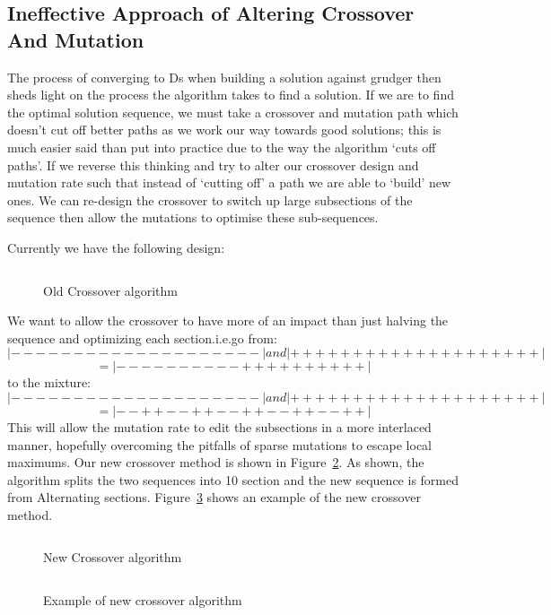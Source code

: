 \subsection{Ineffective Approach of Altering Crossover And Mutation}\label{subsec:ineffectiveApproachOfAlteringCrossoverAndMutation}
The process of converging to Ds when building a solution against grudger then sheds light on the process the algorithm takes to find a solution.
If we are to find the optimal solution sequence, we must take a crossover and mutation path which doesn't cut off better paths as we work our way towards good solutions;
this is much easier said than put into practice due to the way the algorithm `cuts off paths'.
If we reverse this thinking and try to alter our crossover design and mutation rate such that instead of `cutting off' a path we are able to `build' new ones.
We can re-design the crossover to switch up large subsections of the sequence then allow the mutations to optimise these sub-sequences.

Currently we have the following design:
\begin{figure}
    \inputminted{python}{code_snippets/oldCrossover.py}
    \caption{Old Crossover algorithm}\label{fig:oldCrossover}
\end{figure}

We want to allow the crossover to have more of an impact than just halving the sequence and optimizing each section.i.e.go from:
\[|--------------------| and |++++++++++++++++++++|\]
\[= |----------++++++++++|\]
to the mixture:
\[|--------------------| and |++++++++++++++++++++|\]
\[= |--++--++--++--++--++|\]
This will allow the mutation rate to edit the subsections in a more interlaced manner, hopefully overcoming the pitfalls of sparse mutations to escape local maximums.
Our new crossover method is shown in Figure~\ref{fig:newCrossover}.
As shown, the algorithm splits the two sequences into 10 section and the new sequence is formed from Alternating sections.
Figure~\ref{fig:newCrossoverEX} shows an example of the new crossover method.

\begin{figure}
    \inputminted{python}{code_snippets/newCrossover.py}
    \caption{New Crossover algorithm}\label{fig:newCrossover}
\end{figure}

\begin{figure}
    \inputminted{python}{code_snippets/newCrossoverEX.py}
    \caption{Example of new crossover algorithm}\label{fig:newCrossoverEX}
\end{figure}

